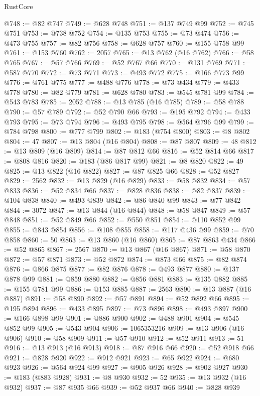 \begin{lexlean}{RustCore}
\begin{coremodule}
@748 := @82 @747
@749 := @628 @748
@751 := @137 @749 @99
@752 := @745 @751
@753 := @738 @752
@754 := @135 @753
@755 := @73 @474
@756 := @473 @755
@757 := @82 @756
@758 := @628 @757
@760 := @155 @758 @99
@761 := @153 @760
@762 := 2057
@765 := @13 @762 (@16 @762)
@766 := @58 @765
@767 := @57 @766
@769 := @52 @767 @66
@770 := @131 @769
@771 := @587 @770
@772 := @73 @771
@773 := @493 @772
@775 := @166 @773 @99
@776 := @761 @775
@777 := @488 @776
@778 := @73 @434
@779 := @433 @778
@780 := @82 @779
@781 := @628 @780
@783 := @545 @781 @99
@784 := @543 @783
@785 := 2052
@788 := @13 @785 (@16 @785)
@789 := @58 @788
@790 := @57 @789
@792 := @52 @790 @66
@793 := @195 @792
@794 := @433 @793
@795 := @73 @794
@796 := @493 @795
@798 := @564 @796 @99
@799 := @784 @798
@800 := @777 @799
@802 := @183 (@754 @800)
@803 := @8 @802
@804 := 47
@807 := @13 @804 (@16 @804)
@808 := @87 @807
@809 := 48
@812 := @13 @809 (@16 @809)
@814 := @87 @812 @66
@816 := @52 @814 @66
@817 := @808 @816
@820 := @183 (@86 @817 @99)
@821 := @8 @820
@822 := 49
@825 := @13 @822 (@16 @822)
@827 := @87 @825 @66
@828 := @52 @827
@829 := 2562
@832 := @13 @829 (@16 @829)
@833 := @58 @832
@834 := @57 @833
@836 := @52 @834 @66
@837 := @828 @836
@838 := @82 @837
@839 := @104 @838
@840 := @493 @839
@842 := @86 @840 @99
@843 := @77 @842
@844 := 3072
@847 := @13 @844 (@16 @844)
@848 := @58 @847
@849 := @57 @848
@851 := @52 @849 @66
@852 := @550 @851
@854 := @110 @852 @99
@855 := @843 @854
@856 := @108 @855
@858 := @117 @436 @99
@859 := @70 @858
@860 := 50
@863 := @13 @860 (@16 @860)
@865 := @87 @863 @434
@866 := @52 @865
@867 := 2567
@870 := @13 @867 (@16 @867)
@871 := @58 @870
@872 := @57 @871
@873 := @52 @872
@874 := @873 @66
@875 := @82 @874
@876 := @866 @875
@877 := @82 @876
@878 := @493 @877
@880 := @137 @878 @99
@881 := @859 @880
@882 := @856 @881
@883 := @135 @882
@885 := @155 @781 @99
@886 := @153 @885
@887 := 2563
@890 := @13 @887 (@16 @887)
@891 := @58 @890
@892 := @57 @891
@894 := @52 @892 @66
@895 := @195 @894
@896 := @433 @895
@897 := @73 @896
@898 := @493 @897
@900 := @166 @898 @99
@901 := @886 @900
@902 := @488 @901
@904 := @545 @852 @99
@905 := @543 @904
@906 := 1065353216
@909 := @13 @906 (@16 @906)
@910 := @58 @909
@911 := @57 @910
@912 := @52 @911
@913 := 51
@916 := @13 @913 (@16 @913)
@918 := @87 @916 @66
@920 := @52 @918 @66
@921 := @828 @920
@922 := @912 @921
@923 := @65 @922
@924 := @680 @923
@926 := @564 @924 @99
@927 := @905 @926
@928 := @902 @927
@930 := @183 (@883 @928)
@931 := @8 @930
@932 := 52
@935 := @13 @932 (@16 @932)
@937 := @87 @935 @66
@939 := @52 @937 @66
@940 := @828 @939

\end{coremodule}
\end{lexlean}
